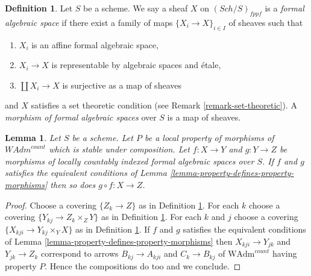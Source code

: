 \documentclass{stacks-project}
\theoremstyle{plain}
\newtheorem{lemma}[subsection]{Lemma}
\theoremstyle{definition}
\newtheorem{definition}[subsection]{Definition}
\theoremstyle{remark}
\numberwithin{equation}{subsection}
\def\Sch{\mathit{Sch}}
\begin{document}
\begin{definition}
\label{definition-formal-algebraic-space}
Let $S$ be a scheme. We say a sheaf $X$ on $(\Sch/S)_{fppf}$ is a
{\it formal algebraic space} if there exist a family of maps
$\{X_i \to X\}_{i \in I}$ of sheaves such that
\begin{enumerate}
\item $X_i$ is an affine formal algebraic space,
\item $X_i \to X$ is representable by algebraic spaces and \'etale,
\item $\coprod X_i \to X$ is surjective as a map of sheaves
\end{enumerate}
and $X$ satisfies a set theoretic condition
(see Remark \ref{remark-set-theoretic}). A
{\it morphism of formal algebraic spaces}
over $S$ is a map of sheaves.
\end{definition}

\begin{lemma}
\label{lemma-composition-property-morphisms}
Let $S$ be a scheme. Let $P$ be a local property of morphisms of
$\textit{WAdm}^{count}$ which is stable under composition.
Let $f : X \to Y$ and $g : Y \to Z$ be morphisms of locally countably indexed
formal algebraic spaces over $S$. If $f$ and $g$
satisfies the equivalent conditions of
Lemma \ref{lemma-property-defines-property-morphisms}
then so does $g \circ f : X \to Z$.
\end{lemma}

\begin{proof}
Choose a covering $\{Z_k \to Z\}$ as in
Definition \ref{definition-formal-algebraic-space}.
For each $k$ choose a covering $\{Y_{kj} \to Z_k \times_Z Y\}$
as in Definition \ref{definition-formal-algebraic-space}.
For each $k$ and $j$ choose a covering $\{X_{kji} \to Y_{kj} \times_Y X\}$
as in Definition \ref{definition-formal-algebraic-space}.
If $f$ and $g$
satisfies the equivalent conditions of
Lemma \ref{lemma-property-defines-property-morphisms}
then $X_{kji} \to Y_{jk}$ and $Y_{jk} \to Z_k$
correspond to arrows
$B_{kj} \to A_{kji}$ and $C_k \to B_{kj}$ of
$\text{WAdm}^{count}$ having property $P$.
Hence the compositions do too and we conclude.
\end{proof}
\end{document}
